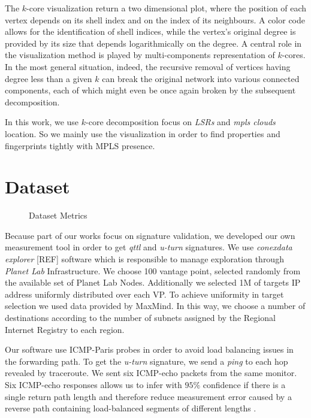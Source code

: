 The $k$-core visualization return a two dimensional plot, where the position of each vertex depends on its shell index and on the index of its neighbours. A color code allows for the identification of shell indices, while the vertex’s original degree is provided by its size that depends logarithmically on the degree. A central role in the visualization method is played by multi-components representation of $k$-cores. In the most general situation, indeed, the recursive removal of vertices having degree less than a given $k$ can break the original network into various connected components, each of which might even be once again broken by the subsequent decomposition.

In this work, we use $k$-core decomposition focus on \textit{LSRs} and \textit{mpls clouds} location. So we mainly use the visualization in order to find properties and fingerprints tightly with MPLS presence.


\section{Dataset}

\begin{figure*}[!t]
\centering
{}
\hfil
{}
\hfil
{}
\caption{ Dataset Metrics}
\label{fig_metrics}
\end{figure*}

Because part of our works focus on signature validation, we developed our own measurement tool in order to get \textit{qttl} and \textit{u-turn} signatures. We use \textit{conexdata explorer} [REF] software which is responsible to manage exploration through \textit{Planet Lab} Infrastructure. We choose 100 vantage point, selected randomly from the available set of Planet Lab Nodes. Additionally we selected 1M of targets IP address uniformly distributed over each VP. To achieve uniformity in target selection we used data provided by MaxMind. In this way, we choose a number of destinations according to the number of subnets assigned by the Regional Internet Registry to each region.

Our software use ICMP-Paris probes in order to avoid load balancing issues in the forwarding path. To get the \textit{u-turn} signature, we send a \textit{ping} to each hop revealed by traceroute. We sent six ICMP-echo packets from the same monitor. Six ICMP-echo responses allows us to infer with $95\%$ confidence if there is a single return path length and therefore reduce measurement error caused by a reverse path containing load-balanced segments of different lengths \cite{BRICE07}.

